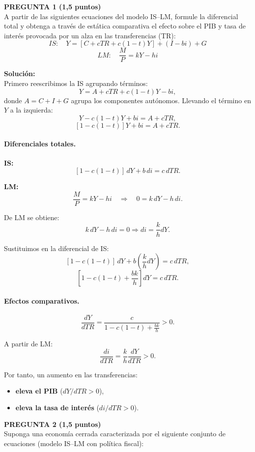 \documentclass[11pt,addpoints]{article}
\begin{document}
\textbf{PREGUNTA 1 (1,5 puntos)}\\[0.2cm]
A partir de las siguientes ecuaciones del modelo IS--LM, formule la diferencial total y obtenga a través de estática comparativa el efecto sobre el PIB y tasa de interés provocada por un alza en las transferencias (TR):
\[
IS: \quad Y = [C + cTR + c(1 - t)Y] + (I - bi) + G
\]
\[
LM: \quad \frac{M}{P} = kY - hi
\]

\vspace{0.2cm}
\textbf{Solución:}\\[0.1cm]
Primero reescribimos la IS agrupando términos:
\[
Y = A + cTR + c(1-t)Y - bi,
\]
donde $A = C + I + G$ agrupa los componentes autónomos. Llevando el término en $Y$ a la izquierda:
\[
Y - c(1-t)Y + bi = A + cTR,
\]
\[
[1 - c(1-t)]Y + bi = A + cTR.
\]

\paragraph{Diferenciales totales.}

\textbf{IS:}
\[
[1 - c(1-t)]\,dY + b\,di = c\,dTR.
\]

\textbf{LM:}
\[
\frac{M}{P} = kY - hi \quad\Rightarrow\quad 0 = k\,dY - h\,di.
\]

De LM se obtiene:
\[
k\,dY - h\,di = 0 \Rightarrow di = \frac{k}{h}dY.
\]

Sustituimos en la diferencial de IS:
\[
[1 - c(1-t)]\,dY + b\left(\frac{k}{h}dY\right) = c\,dTR,
\]
\[
\left[1 - c(1-t) + \frac{bk}{h}\right]dY = c\,dTR.
\]

\paragraph{Efectos comparativos.}
\[
\frac{dY}{dTR} = \frac{c}{1 - c(1-t) + \frac{bk}{h}} > 0.
\]

A partir de LM:
\[
\frac{di}{dTR} = \frac{k}{h}\frac{dY}{dTR} > 0.
\]

Por tanto, un aumento en las transferencias:
\begin{itemize}
  \item \textbf{eleva el PIB} ($dY/dTR > 0$),
  \item \textbf{eleva la tasa de interés} ($di/dTR > 0$).
\end{itemize}

\newpage
\vspace*{0.5cm}
\textbf{PREGUNTA 2 (1,5 puntos)}\\[0.2cm]
Suponga una economía cerrada caracterizada por el siguiente conjunto de ecuaciones (modelo IS–LM con política fiscal):
\end{document}
